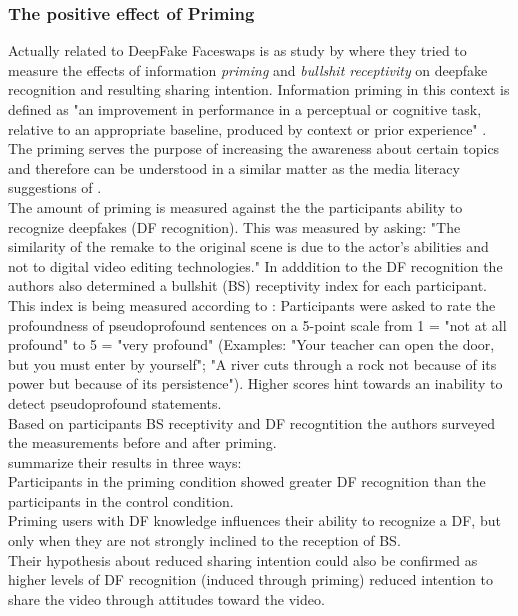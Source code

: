 \documentclass[
  a4paper,  %
  twoside,  %
  bibliography=totoc,
  headsepline,
  cleardoublepage=empty,
  parskip=half,
  draft=false
]{scrbook}
\begin{document}
\subsubsection*{The positive effect of Priming}
Actually related to DeepFake Faceswaps is as study by \citeauthor{iacobucciDeepfakesUnmaskedEffects2021} where they tried to measure the effects of information \textit{priming} and \textit{bullshit receptivity} on deepfake recognition and resulting sharing intention. Information priming in this context is defined as "an improvement in performance in a perceptual or cognitive task, relative to an appropriate baseline, produced by context or prior experience" \cite{iacobucciDeepfakesUnmaskedEffects2021}. The priming serves the purpose of increasing the awareness about certain topics and therefore can be understood in a similar matter as the media literacy suggestions of \citeauthor{hwangEffectsDisinformationUsing2021}. \\
The amount of priming is measured against the the participants ability to recognize deepfakes (DF recognition). This was measured by asking: "The similarity of the remake to the original scene is due to the actor's abilities and not to digital video editing technologies." In adddition to the DF recognition the authors also determined a bullshit (BS) receptivity index for each participant. This index is being measured according to \cite{pennycookReceptionDetectionPseudoprofound2015}: Participants were asked to rate the profoundness of pseudoprofound sentences on a 5-point scale from 1 = "not at all profound" to 5 = "very profound" (Examples: "Your teacher can open the door, but you must enter by yourself"; "A river cuts through a rock not because of its power but because of its persistence"). Higher scores hint towards an inability to detect pseudoprofound statements. \\
Based on participants BS receptivity and DF recogntition the authors surveyed the measurements before and after priming. \\
\citeauthor{iacobucciDeepfakesUnmaskedEffects2021} summarize their results in three ways: \\
Participants in the priming condition showed greater DF recognition than the participants in the control condition. \\
Priming users with DF knowledge influences their ability to recognize a DF, but only when they are not strongly inclined to the reception of BS. \\
Their hypothesis about reduced sharing intention could also be confirmed as higher levels of DF recognition (induced through priming) reduced intention to share the video through attitudes toward the video. \\
\end{document}
